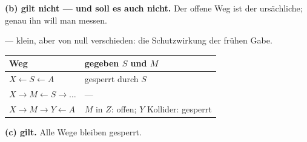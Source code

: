 \begin{aufgabe}
\begin{center}
\begin{minipage}{0.9\textwidth}
\textbf{(b) gilt nicht --- und soll es auch nicht.} Der offene Weg ist der ursächliche; genau ihn will man messen.
\end{minipage}
\end{center}

 --- klein, aber von null verschieden: die Schutzwirkung der frühen Gabe.

\begin{center}
{\small
\renewcommand{\arraystretch}{1.46}
\begin{tabular}{@{}P{3.8cm}P{4.2cm}@{}}
\toprule
\textbf{Weg} & \textbf{gegeben $S$ und $M$}\\
\midrule
$X \leftarrow S \leftarrow A$ & gesperrt durch $S$\\
$X \to M \leftarrow S \to \ldots$ & --- \\
$X \to M \to Y \leftarrow A$ & $M$ in $Z$: offen; $Y$ Kollider: gesperrt\\
\bottomrule
\end{tabular}}
\end{center}

\begin{center}
\begin{minipage}{0.9\textwidth}
\textbf{(c) gilt.} Alle Wege bleiben gesperrt.
\end{minipage}
\end{center}

\begin{center}
\begin{minipage}{0.88\textwidth}
\end{minipage}
\end{center}
\end{aufgabe}

